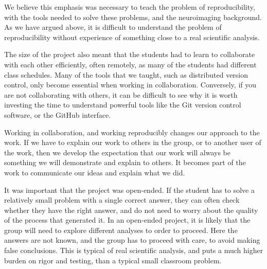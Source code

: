 We believe this emphasis was necessary to teach the problem of
reproducibility, with the tools needed to solve these problems, and the
neuroimaging background.  As we have argued above, it is difficult to
understand the problem of reproducibility without experience of something
close to a real scientific analysis.

The size of the project also meant that the students had to learn to
collaborate with each other efficiently, often remotely, as many of the
students had different class schedules.  Many of the tools that we taught,
such as distributed version control, only become essential when working in
collaboration.  Conversely, if you are not collaborating with others, it can
be difficult to see why it is worth investing the time to understand powerful
tools like the Git version control software, or the GitHub interface.

Working in collaboration, and working reproducibly changes our approach to the
work. If we have to explain our work to others in the group, or to
another user of the work, then we develop the expectation that our work
will always be something we will demonstrate and explain to others.  It
becomes part of the work to communicate our ideas and explain what we did.

It was important that the project was open-ended.  If the student has to solve
a relatively small problem with a single correct answer, they can often check
whether they have the right answer, and do not need to worry about the quality
of the process that generated it.  In an open-ended project, it is likely that
the group will need to explore different analyses to order to proceed.  Here
the answers are not known, and the group has to proceed with care, to avoid
making false conclusions.  This is typical of real scientific analysis, and
puts a much higher burden on rigor and testing, than a typical small classroom
problem.





